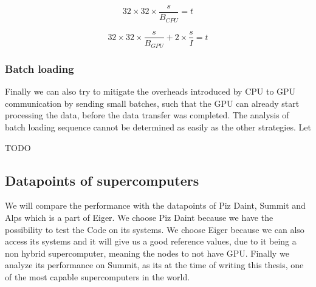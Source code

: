 \documentclass[]{article}
\begin{document}
\begin{center}
	\begin{equation}
		32 \times 32 \times \frac{s}{B_{CPU}} = t
		\label{eq:cputree}
	\end{equation}
\end{center}

\begin{center}
	\begin{equation}
		32 \times 32 \times \frac{s}{B_{GPU}} + 2 \times \frac{s}{I} = t
		\label{eq:gputree}
	\end{equation}
\end{center}


\subsubsection{Batch loading}

Finally we can also try to mitigate the overheads introduced by CPU to GPU communication by sending small batches, such that the GPU can already start processing the data, before the data transfer was completed. The analysis of batch loading sequence cannot be determined as easily as the other strategies. Let 

TODO
\begin{figure}[H]
	\begin{center}
		\begin{tikzpicture}

		\end{tikzpicture}
	\end{center}
\end{figure}


\subsection{Datapoints of supercomputers}

We will compare the performance with the datapoints of Piz Daint, Summit and Alps which is a part of Eiger. We choose Piz Daint because we have the possibility to test the Code on its systems. We choose Eiger because we can also access its systems and it will give us a good reference values, due to it being a non hybrid supercomputer, meaning the nodes to not have GPU. Finally we analyze its performance on Summit, as its at the time of writing this thesis, one of the most capable supercomputers in the world.
\end{document}
